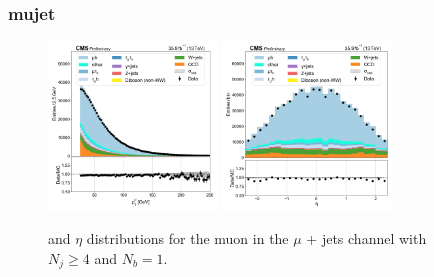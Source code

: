 \subsubsection{mujet}

\begin{figure}[htb!]
    \centering
    \includegraphics[width=0.4\textwidth]{chapters/Analysis/sectionPlots/figures/data_mc_overlays/mujet_2016_cat_gt4_eq1_signal_linear_lepton_lepton1_pt}
    \includegraphics[width=0.4\textwidth]{chapters/Analysis/sectionPlots/figures/data_mc_overlays/mujet_2016_cat_gt4_eq1_signal_linear_lepton_lepton1_eta}
    \caption{\pt and $\eta$ distributions for the muon in the $\mu$ + jets
    channel with $N_{j} \geq 4$ and $N_{b} = 1$.
    \label{fig:analysis:plots:mujet_1_kinematic}}
\end{figure}

